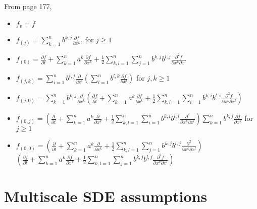 \documentclass[12pt]{article}
\begin{document}
From page 177,
\begin{itemize}
\item $f_v = f$
\item $f_{(j)} = \sum_{k=1}^n b^{k,j} \frac{\partial f}{\partial x^k}$, for $j \ge 1$
\item $f_{(0)} = \frac{\partial f}{\partial t} + \sum_{k=1}^n a^k \frac{\partial f}{\partial x^k} + \frac{1}{2} \sum_{k,l=1}^n \sum_{j=1}^n b^{k,j} b^{l,j} \frac{\partial^2 f}{\partial x^k \partial x^l}$
\item $f_{(j, k)} = \sum_{i=1}^n b^{i,j} \frac{\partial }{\partial x^i} \left( \sum_{l=1}^n b^{l,k} \frac{\partial f}{\partial x^l} \right) $ for $j,k \ge 1$
\item $f_{(j,0)} = \sum_{k=1}^n b^{k,j} \frac{\partial }{\partial x^k} \left( \frac{\partial f}{\partial t} + \sum_{k=1}^n a^k \frac{\partial f}{\partial x^k} + \frac{1}{2} \sum_{k,l=1}^n \sum_{i=1}^n b^{k,i} b^{l,i} \frac{\partial^2 f}{\partial x^k \partial x^l} \right)$
\item $f_{(0, j)} = \left( \frac{\partial}{\partial t} + \sum_{k=1}^n a^k \frac{\partial}{\partial x^k} + \frac{1}{2} \sum_{k,l=1}^n \sum_{i=1}^n b^{k,i} b^{l,i} \frac{\partial^2}{\partial x^k \partial x^l} \right)  \sum_{k=1}^n b^{k,j} \frac{\partial f}{\partial x^k}$ for $j \ge 1$
\item $f_{(0,0)} = \left( \frac{\partial}{\partial t} + \sum_{k=1}^n a^k \frac{\partial}{\partial x^k} + \frac{1}{2} \sum_{k,l=1}^n \sum_{j=1}^n b^{k,j} b^{l,j} \frac{\partial^2}{\partial x^k \partial x^l} \right) $\\ $ \left( \frac{\partial f}{\partial t} + \sum_{k=1}^n a^k \frac{\partial f}{\partial x^k} + \frac{1}{2} \sum_{k,l=1}^n \sum_{j=1}^n b^{k,j} b^{l,j} \frac{\partial^2 f}{\partial x^k \partial x^l} \right)$
\end{itemize}

\section{Multiscale SDE assumptions}
\end{document}
